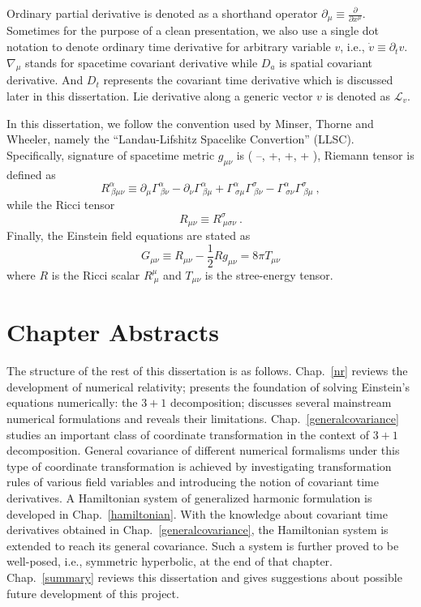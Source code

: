 Ordinary partial derivative is denoted as a shorthand operator $
\partial_{\mu} \equiv \frac{\partial}{\partial x^{\mu}}$. Sometimes for the purpose of a clean presentation, we also use a single dot notation to denote ordinary time derivative for arbitrary variable $v$, i.e., ${\dot v} \equiv \partial_{t}v$. $\nabla_{\mu}$ stands for spacetime covariant derivative while $D_{a}$ is spatial covariant derivative. And $D_{t}$ represents the covariant time derivative which is discussed later in this dissertation. Lie derivative along a generic vector $v$ is denoted as $\mathcal{L}_{v}$. 

In this dissertation, we follow the convention used by Minser, Thorne and Wheeler\cite{Misner:1974qy}, namely the ``Landau-Lifshitz Spacelike Convertion'' (LLSC). Specifically, signature of spacetime metric $g_{\mu\nu}$ is ( --, +, +, + ), Riemann tensor is defined as 
\begin{equation}
	R^{\alpha}_{~\beta \mu \nu} \equiv 
	\partial_{\mu}\Gamma^{\alpha}_{~\beta \nu} - 
	\partial_{\nu}\Gamma^{\alpha}_{~\beta \mu} + \Gamma^{\alpha}_{~\sigma \mu}\Gamma^{\sigma}_{~\beta \nu} - \Gamma^{\alpha}_{~\sigma \nu}\Gamma^{\sigma}_{~\beta\mu} \ , 
\end{equation}
while the Ricci tensor 
\begin{equation}
	R_{\mu\nu} \equiv R^{\sigma}_{~\mu\sigma\nu} \ . 
\end{equation}
Finally, the Einstein field equations are stated as 
\begin{equation}
	G_{\mu\nu} \equiv R_{\mu\nu} - \frac{1}{2} R g_{\mu\nu} = 8\pi T_{\mu\nu} 
\end{equation}
where $R$ is the Ricci scalar $R^{\mu}_{~\mu}$ and $T_{\mu\nu}$ is the stree-energy tensor. 

\section{Chapter Abstracts}\label{abstracts}
The structure of the rest of this dissertation is as follows. Chap.~\ref{nr} reviews the development of numerical relativity; presents the foundation of solving Einstein's equations numerically: the $3 + 1$ decomposition; discusses several mainstream numerical formulations and reveals their limitations. Chap.~\ref{generalcovariance} studies an important class of coordinate transformation in the context of $3 + 1$ decomposition. General covariance of different numerical formalisms under this type of coordinate transformation is achieved by investigating transformation rules of various field variables and introducing the notion of covariant time derivatives. A Hamiltonian system of generalized harmonic formulation is developed in Chap.~\ref{hamiltonian}. With the knowledge about covariant time derivatives obtained in Chap.~\ref{generalcovariance}, the Hamiltonian system is extended to reach its general covariance. Such a system is further proved to be well-posed, i.e., symmetric hyperbolic, at the end of that chapter. Chap.~\ref{summary} reviews this dissertation and gives suggestions about possible future development of this project. 
